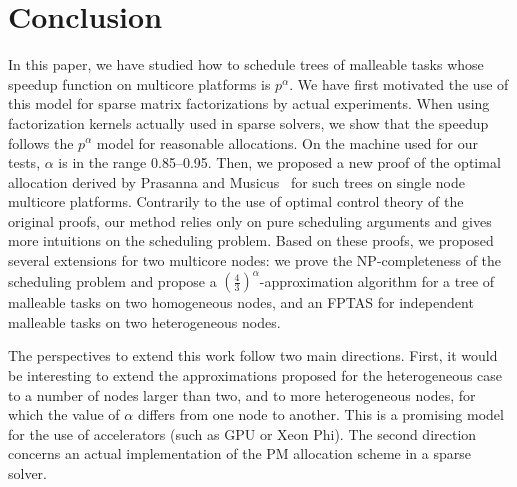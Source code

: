 \documentclass{llncs}
\newcommand{\frtrd}{\ensuremath{\left(\frac{4}{3}\right)^\alpha}}
\begin{document}
\fi 





























   











\section{Conclusion}

In this paper, we have studied how to schedule trees of malleable
tasks whose speedup function on multicore platforms is $p^\alpha$. We
have first motivated the use of this model for sparse matrix
factorizations by actual experiments. When using factorization kernels
actually used in sparse solvers, we show that the speedup follows the
$p^\alpha$ model for reasonable allocations. On the machine used for
our tests, $\alpha$ is in the range 0.85--0.95. Then, we proposed a
new proof of the optimal allocation derived by Prasanna and
Musicus~\cite{prasmus,prasmus2} for such trees on single node
multicore platforms. Contrarily to the use of optimal control theory
of the original proofs, our method relies only on pure scheduling
arguments and gives more intuitions on the scheduling problem. Based
on these proofs, we proposed several extensions for two multicore
nodes: we prove the NP-completeness of the scheduling problem and propose
a \frtrd-approximation algorithm for a tree of malleable tasks on two
homogeneous nodes, and an FPTAS for independent malleable tasks on two
heterogeneous nodes. 



The perspectives to extend this work follow two main
directions. First, it would be interesting to extend the
approximations proposed for the heterogeneous case to a number of nodes
larger than two, and to more heterogeneous nodes, for which the value
of $\alpha$ differs from one node to another. This is a promising
model for the use of accelerators (such as GPU or Xeon Phi). The
second direction concerns an actual implementation of the PM
allocation scheme in a sparse solver. 




\end{document}
